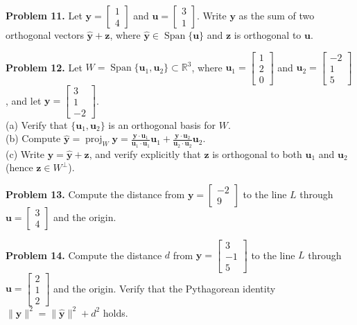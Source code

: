 \documentclass[11pt, letterpaper]{article}
\theoremstyle{definition}
\theoremstyle{remark}
\begin{document}
\textbf{Problem 11.} Let $\mathbf{y} = \begin{bmatrix} 1 \\ 4 \end{bmatrix}$ and $\mathbf{u} = \begin{bmatrix} 3 \\ 1 \end{bmatrix}$. Write $\mathbf{y}$ as the sum of two orthogonal vectors $\hat{\mathbf{y}} + \mathbf{z}$, where $\hat{\mathbf{y}} \in \operatorname{Span}\{\mathbf{u}\}$ and $\mathbf{z}$ is orthogonal to $\mathbf{u}$.

\textbf{Problem 12.} Let $W = \operatorname{Span}\{\mathbf{u}_1, \mathbf{u}_2\} \subset \mathbb{R}^3$, where $\mathbf{u}_1 = \begin{bmatrix} 1 \\ 2 \\ 0 \end{bmatrix}$ and $\mathbf{u}_2 = \begin{bmatrix} -2 \\ 1 \\ 5 \end{bmatrix}$, and let $\mathbf{y} = \begin{bmatrix} 3 \\ 1 \\ -2 \end{bmatrix}$. \\
(a) Verify that $\{\mathbf{u}_1, \mathbf{u}_2\}$ is an orthogonal basis for $W$. \\
(b) Compute $\hat{\mathbf{y}} = \operatorname{proj}_W \mathbf{y} = \frac{\mathbf{y} \cdot \mathbf{u}_1}{\mathbf{u}_1 \cdot \mathbf{u}_1}\mathbf{u}_1 + \frac{\mathbf{y} \cdot \mathbf{u}_2}{\mathbf{u}_2 \cdot \mathbf{u}_2}\mathbf{u}_2$. \\
(c) Write $\mathbf{y} = \hat{\mathbf{y}} + \mathbf{z}$, and verify explicitly that $\mathbf{z}$ is orthogonal to both $\mathbf{u}_1$ and $\mathbf{u}_2$ (hence $\mathbf{z} \in W^\perp$).

\textbf{Problem 13.} Compute the distance from $\mathbf{y} = \begin{bmatrix} -2 \\ 9 \end{bmatrix}$ to the line $L$ through $\mathbf{u} = \begin{bmatrix} 3 \\ 4 \end{bmatrix}$ and the origin.

\textbf{Problem 14.} Compute the distance $d$ from $\mathbf{y} = \begin{bmatrix} 3 \\ -1 \\ 5 \end{bmatrix}$ to the line $L$ through $\mathbf{u} = \begin{bmatrix} 2 \\ 1 \\ 2 \end{bmatrix}$ and the origin. Verify that the Pythagorean identity $\|\mathbf{y}\|^2 = \|\hat{\mathbf{y}}\|^2 + d^2$ holds.
\end{document}
